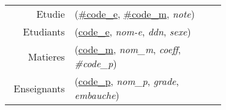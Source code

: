 
\usepackage[normalem]{ulem}
\newenvironment{mld}
  {\par\begin{minipage}{\linewidth}\begin{tabular}{rp{0.7\linewidth}}}
  {\end{tabular}\end{minipage}\par}
\newcommand{\relat}[1]{\textsc{#1}}
\newcommand{\attr}[1]{\emph{#1}}
\newcommand{\prim}[1]{\uline{#1}}
\newcommand{\foreign}[1]{\#\textsl{#1}}


\begin{mld}
  Etudie & (\prim{#code\_e}, \prim{#code\_m}, \attr{note})\\
  Etudiants & (\prim{code\_e}, \attr{nom-e}, \attr{ddn}, \attr{sexe})\\
  Matieres & (\prim{code\_m}, \attr{nom\_m}, \attr{coeff}, \attr{#code\_p})\\
  Enseignants & (\prim{code\_p}, \attr{nom\_p}, \attr{grade}, \attr{embauche})\\
\end{mld}